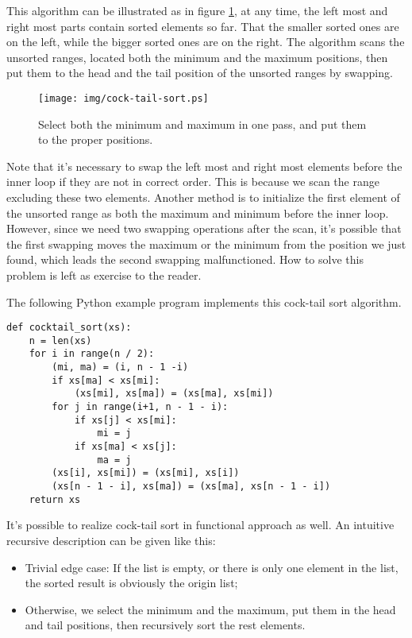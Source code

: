 \documentclass{article}
\begin{document}
This algorithm can be illustrated as in figure \ref{fig:cock-tail-sort}, at any time, the left most and right most
parts contain sorted elements so far. That the smaller sorted ones are on the left, while the bigger sorted ones
are on the right. The algorithm scans the unsorted ranges, located both the minimum and the maximum positions,
then put them to the head and the tail position of the unsorted ranges by swapping.

\begin{figure}[htbp]
  \centering
  \texttt{[image: img/cock-tail-sort.ps]}
  \caption{Select both the minimum and maximum in one pass, and put them to the proper positions.}
  \label{fig:cock-tail-sort}
\end{figure}

Note that it's necessary to swap the left most and right most elements before the inner loop if they are
not in correct order. This is because we scan the range excluding these two elements. Another method is to
initialize the first element of the unsorted range as both the maximum and minimum before the inner loop.
However, since we need two swapping operations after the scan, it's possible that the first swapping moves
the maximum or the minimum from the position we just found, which leads the second swapping malfunctioned.
How to solve this problem is left as exercise to the reader.

The following Python example program implements this cock-tail sort algorithm.

\lstset{language=Python}
\begin{lstlisting}
def cocktail_sort(xs):
    n = len(xs)
    for i in range(n / 2):
        (mi, ma) = (i, n - 1 -i)
        if xs[ma] < xs[mi]:
            (xs[mi], xs[ma]) = (xs[ma], xs[mi])
        for j in range(i+1, n - 1 - i):
            if xs[j] < xs[mi]:
                mi = j
            if xs[ma] < xs[j]:
                ma = j
        (xs[i], xs[mi]) = (xs[mi], xs[i])
        (xs[n - 1 - i], xs[ma]) = (xs[ma], xs[n - 1 - i])
    return xs
\end{lstlisting}

It's possible to realize cock-tail sort in functional approach as well. An intuitive recursive description
can be given like this:

\begin{itemize}
  \item Trivial edge case: If the list is empty, or there is only one element in the list, the sorted result is obviously the origin list;
  \item Otherwise, we select the minimum and the maximum, put them in the head and tail positions, then recursively sort the rest elements.
\end{itemize}
\end{document}

